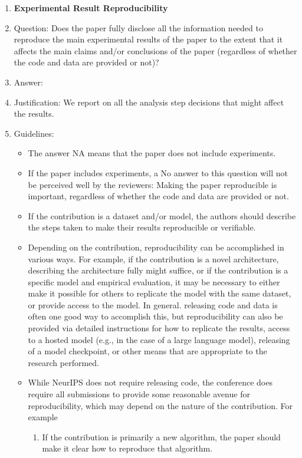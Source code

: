 \documentclass{article} %
\newcounter{ct}
\theoremstyle{definition}
\theoremstyle{remark}
\begin{document}
\begin{enumerate}
    \item {\bf Experimental Result Reproducibility}
    \item[] Question: Does the paper fully disclose all the information needed to reproduce the main experimental results of the paper to the extent that it affects the main claims and/or conclusions of the paper (regardless of whether the code and data are provided or not)?
    \item[] Answer: \answerYes{} %
    \item[] Justification: We report on all the analysis step decisions that might affect the results.
    \item[] Guidelines:
    \begin{itemize}
        \item The answer NA means that the paper does not include experiments.
        \item If the paper includes experiments, a No answer to this question will not be perceived well by the reviewers: Making the paper reproducible is important, regardless of whether the code and data are provided or not.
        \item If the contribution is a dataset and/or model, the authors should describe the steps taken to make their results reproducible or verifiable.
        \item Depending on the contribution, reproducibility can be accomplished in various ways. For example, if the contribution is a novel architecture, describing the architecture fully might suffice, or if the contribution is a specific model and empirical evaluation, it may be necessary to either make it possible for others to replicate the model with the same dataset, or provide access to the model. In general. releasing code and data is often one good way to accomplish this, but reproducibility can also be provided via detailed instructions for how to replicate the results, access to a hosted model (e.g., in the case of a large language model), releasing of a model checkpoint, or other means that are appropriate to the research performed.
        \item While NeurIPS does not require releasing code, the conference does require all submissions to provide some reasonable avenue for reproducibility, which may depend on the nature of the contribution. For example
        \begin{enumerate}
            \item If the contribution is primarily a new algorithm, the paper should make it clear how to reproduce that algorithm.

\end{enumerate}
\end{itemize}
\end{enumerate}
\end{document}
